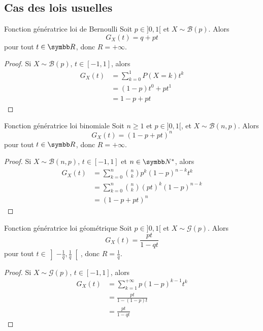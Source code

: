 \subsection{Cas des lois usuelles }

\begin{proposition}{Fonction génératrice loi de Bernoulli}{}
    Soit $p \in ]0, 1[$ et $X \sim \mathcal B(p)$. Alors 
    $$ G_X(t) = q + p t $$
    pour tout $t \in \R$, donc $R = + \infty$.
\end{proposition}

\begin{proof}
    Si $X \sim \mathcal B(p)$, $t \in [-1, 1]$, alors
    \begin{align}
        G_X(t) & = \sum_{k = 0}^1 P(X = k) t^k \\
        & = (1 - p) t^0 + p t^1 \\
        & = 1 - p + p t
    \end{align}
\end{proof}

\begin{proposition}{Fonction génératrice loi binomiale}{}
    Soit $n \geqslant 1$ et $p \in ]0, 1[$, et $X \sim \mathcal B(n, p)$. Alors 
    $$ G_X(t) = (1 - p + p t)^n $$
    pour tout $t \in \R$, donc $R = + \infty$.
\end{proposition}

\begin{proof}
    Si $X \sim \mathcal B(n, p)$, $t \in [-1, 1]$ et $n \in \N^*$, alors
    \begin{align}
        G_X(t) & = \sum_{k = 0}^n \binom n k p^k (1 - p)^{n - k} t^k \\
        & = \sum_{k = 0}^n \binom n k (p t)^k (1 - p)^{n - k} \\
        & = (1 - p + p t)^n
    \end{align}
\end{proof}

\begin{proposition}{Fonction génératrice loi géométrique}{}
    Soit $p \in ]0, 1[$ et $X \sim \mathcal G(p)$. Alors 
    $$ G_X(t) = \frac{pt}{1 - q t} $$
    pour tout $t \in \left]-\frac 1 q, \frac 1 q \right[$, donc 
    $R = \frac 1 q $.
\end{proposition}

\begin{proof}
    Si $X \sim \mathcal G(p)$, $t \in [-1, 1]$, alors
    \begin{align}
        G_X(t) & = \sum_{k = 1}^{+\infty} p (1 - p)^{k - 1} t^k \\
        & = \frac{pt}{1 - (1 - p) t} \\
        & = \frac{pt}{1 - qt}
    \end{align}
\end{proof}

